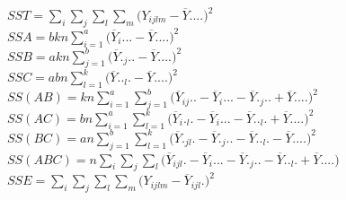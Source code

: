 \documentclass[11pt,a4paper]{article}
\theoremstyle{definition}
\begin{document}
$SST = \displaystyle{\sum_i\sum_j\sum_l\sum_m\big(Y_{ijlm}-\overline{Y}....\big)^2}$\\

$SSA = \displaystyle{bkn\sum^a_{i=1}\big(\overline{Y}_i...-\overline{Y}....\big)^2}$\\

$SSB = \displaystyle{akn\sum^b_{j=1}\big(\overline{Y}._j..-\overline{Y}....\big)^2}$\\

$SSC = \displaystyle{abn\sum^k_{l=1}\big(\overline{Y}.._l.-\overline{Y}....\big)^2}$\\

$SS(AB) = \displaystyle{kn\sum^a_{i=1}\sum^b_{j=1}\big(\overline{Y}_{ij}..-\overline{Y}_i...-\overline{Y}._j..+\overline{Y}....\big)^2}$\\

$SS(AC) = \displaystyle{bn\sum^a_{i=1}\sum^k_{l=1}\big(\overline{Y}_i._l.-\overline{Y}_i...-\overline{Y}.._l.+\overline{Y}....\big)^2}$\\

$SS(BC) =\displaystyle{an\sum^b_{j=1}\sum^k_{l=1}\big(\overline{Y}._{jl}.-\overline{Y}._j..-\overline{Y}.._l.-\overline{Y}....\big)^2}$\\

$SS(ABC) = \displaystyle{n\sum_i\sum_j\sum_l\big(\overline{Y}_{ijl}.-\overline{Y}_i...-\overline{Y}._j..-\overline{Y}.._l.+\overline{Y}....\big)}$\\

$SSE = \displaystyle{\sum_i\sum_j\sum_l\sum_m\big(Y_{ijlm}-\overline{Y}_{ijl}.\big)^2}$
\end{document}
